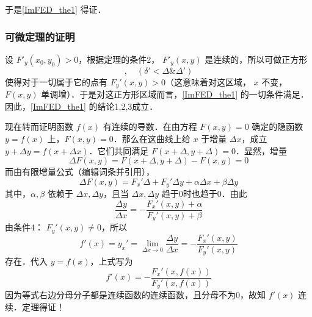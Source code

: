 于是\autoref{ImFED_the1} 得证．
\subsubsection{可微定理的证明}
设 $F'_y(x_0,y_0)>0$，根据定理的条件2， $F'_y(x,y)$ 是连续的，所以可做正方形
\begin{equation}
[x_0-\delta',x_0+\delta';y_0-\delta',y_0+\delta'],\quad(\delta'<\Delta \&\Delta') 
\end{equation}
使得对于一切属于它的点有 $F_y'(x,y)>0$（这意味着对这区域， $x$ 不变，$F(x,y)$ 单调增）．于是对这正方形区域而言，\autoref{ImFED_the1} 的一切条件满足．因此，\autoref{ImFED_the1} 的结论1,2,3成立．

现在转而证明函数 $f(x)$ 有连续的导数．在由方程 $F(x,y)=0$ 确定的隐函数 $y=f(x)$ 上，$F(x,y)=0$．那么在这曲线上给 $x$ 于增量 $\Delta x$，成立 $y+\Delta y=f(x+\Delta x)$．它们共同满足 $F(x+\Delta,y+\Delta)=0$．显然，增量
\begin{equation}
\Delta F(x,y)=F(x+\Delta,y+\Delta)-F(x,y)=0
\end{equation}
而由有限增量公式（编辑词条并引用），
\begin{equation}
\Delta F(x,y)=F_x'\Delta+F_y'\Delta y+\alpha\Delta x+\beta\Delta y
\end{equation}
其中，$\alpha,\beta$ 依赖于 $\Delta x,\Delta y$，且当 $\Delta x,\Delta y$ 趋于0时也趋于0．由此
\begin{equation}
\frac{\Delta y}{\Delta x}=-\frac{F_x'(x,y)+\alpha}{F_y'(x,y)+\beta}
\end{equation}
由条件4： $F_y'(x,y)\neq0$，所以
\begin{equation}
f'(x)=y_x'=\lim_{\Delta x\rightarrow 0}\frac{\Delta y}{\Delta x}=-\frac{F_x'(x,y)}{F_y'(x,y)}
\end{equation}
存在．代入 $y=f(x)$，上式写为
\begin{equation}
f'(x)=-\frac{F_x'(x,f(x))}{F_y'(x,f(x))}
\end{equation}
因为等式右边分母分子都是连续函数的连续函数，且分母不为0，故知 $f'(x)$ 连续．定理得证！

